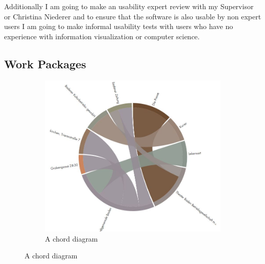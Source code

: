 \documentclass{acmsiggraph}               %
\begin{document}
Additionally I am going to make an usability expert review with my Supervisor or Christina Niederer and to ensure that the software is also usable by non expert users I am going to make informal usability tests with users who have no experience with information visualization or computer science.





\begin{appendices}

\section{Work Packages}

\begin{figure}[tb]
\centering
  \begin{subfigure}{0.6\linewidth}
    \centering
      \includegraphics[width=\linewidth]{img/flowviz.jpg}
      \caption{A chord diagram}
      \label{fig:flowviz}
  \end{subfigure}
  

\end{figure}
\end{appendices}
\end{document}
